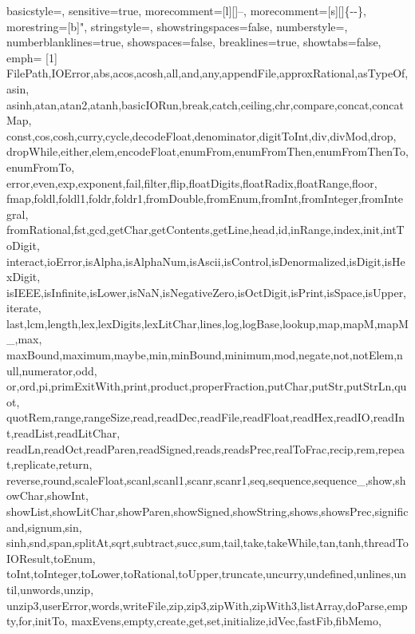 \usepackage{listings}
\usepackage[usenames,dvipsnames]{xcolor}


\def\codesize{\normalsize}

 {
	basicstyle=\ttfamily\codesize,
	sensitive=true,
	morecomment=[l][\color{gray_ulisses}\ttfamily\codesize]{--},
	morecomment=[s][\color{gray_ulisses}\ttfamily\codesize]{\{-}{-\}},
	morestring=[b]",
	stringstyle=\color{red},
	showstringspaces=false,
	numberstyle=\codesize,
	numberblanklines=true,
	showspaces=false,
	breaklines=true,
	showtabs=false,
	emph=
	{[1]
		FilePath,IOError,abs,acos,acosh,all,and,any,appendFile,approxRational,asTypeOf,asin,
		asinh,atan,atan2,atanh,basicIORun,break,catch,ceiling,chr,compare,concat,concatMap,
		const,cos,cosh,curry,cycle,decodeFloat,denominator,digitToInt,div,divMod,drop,
		dropWhile,either,elem,encodeFloat,enumFrom,enumFromThen,enumFromThenTo,enumFromTo,
		error,even,exp,exponent,fail,filter,flip,floatDigits,floatRadix,floatRange,floor,
		fmap,foldl,foldl1,foldr,foldr1,fromDouble,fromEnum,fromInt,fromInteger,fromIntegral,
		fromRational,fst,gcd,getChar,getContents,getLine,head,id,inRange,index,init,intToDigit,
		interact,ioError,isAlpha,isAlphaNum,isAscii,isControl,isDenormalized,isDigit,isHexDigit,
		isIEEE,isInfinite,isLower,isNaN,isNegativeZero,isOctDigit,isPrint,isSpace,isUpper,iterate,
		last,lcm,length,lex,lexDigits,lexLitChar,lines,log,logBase,lookup,map,mapM,mapM_,max,
		maxBound,maximum,maybe,min,minBound,minimum,mod,negate,not,notElem,null,numerator,odd,
		or,ord,pi,primExitWith,print,product,properFraction,putChar,putStr,putStrLn,quot,
		quotRem,range,rangeSize,read,readDec,readFile,readFloat,readHex,readIO,readInt,readList,readLitChar,
		readLn,readOct,readParen,readSigned,reads,readsPrec,realToFrac,recip,rem,repeat,replicate,return,
		reverse,round,scaleFloat,scanl,scanl1,scanr,scanr1,seq,sequence,sequence_,show,showChar,showInt,
		showList,showLitChar,showParen,showSigned,showString,shows,showsPrec,significand,signum,sin,
		sinh,snd,span,splitAt,sqrt,subtract,succ,sum,tail,take,takeWhile,tan,tanh,threadToIOResult,toEnum,
		toInt,toInteger,toLower,toRational,toUpper,truncate,uncurry,undefined,unlines,until,unwords,unzip,
		unzip3,userError,words,writeFile,zip,zip3,zipWith,zipWith3,listArray,doParse,empty,for,initTo,
        maxEvens,empty,create,get,set,initialize,idVec,fastFib,fibMemo,
}}
